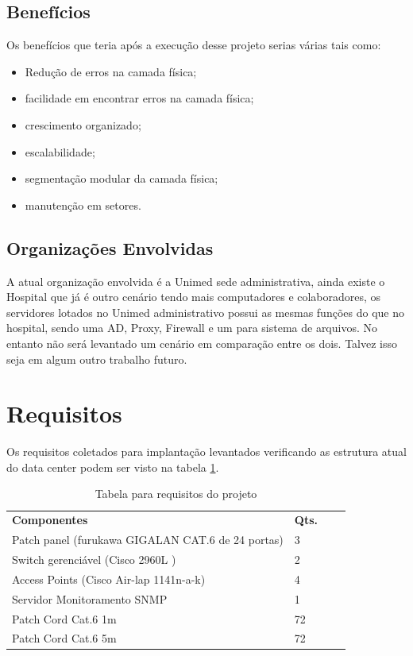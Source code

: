 \documentclass[	DIV=calc,%
							paper=a4,%
							fontsize=12pt,%
							onecolumn]{scrartcl}	 					%
\begin{document}
\subsection{Benefícios}
Os benefícios que teria após a execução desse projeto serias várias tais como: 

\begin{itemize}
	\item Redução de erros na camada física;
	\item facilidade em encontrar erros na camada física;
	\item crescimento organizado;
	\item escalabilidade;
	\item segmentação modular da camada física;
	\item manutenção em setores.
\end{itemize}
 
\subsection{Organizações Envolvidas}
A atual organização envolvida é a Unimed sede administrativa, ainda existe o Hospital que já é outro cenário tendo mais computadores e colaboradores, os servidores lotados no Unimed administrativo possui as mesmas funções do que no hospital, sendo uma AD, Proxy, Firewall e um para sistema de arquivos. No entanto não será levantado um cenário em comparação entre os dois. Talvez isso seja em algum outro trabalho futuro.


\section{Requisitos}\label{sec:Requisitos}
Os requisitos coletados para implantação levantados verificando as estrutura atual do data center podem ser visto na tabela \ref{tab:requisitos}.

\begin{table}[!htbp]
	\centering
	\begin{tabular}{|l|l|ll}
		\cline{1-2}
		\textbf{Componentes}        & \textbf{Qts.} &  &   \\
		\cline{1-2}
		Patch panel (furukawa GIGALAN CAT.6 de 24 portas) & 3    &  &   \\
		Switch gerenciável (Cisco 2960L ) & 2    &  &   \\
		Access Points 	   (Cisco Air-lap 1141n-a-k) & 4    &  &   \\
		Servidor Monitoramento SNMP 	   & 1    &  &   \\	
		Patch Cord Cat.6  1m	   & 72    &  &   \\
		Patch Cord Cat.6  5m	   & 72    &  &   \\
		\cline{1-2} 
	\end{tabular}
		\caption{Tabela para requisitos do projeto}\label{tab:requisitos}
\end{table}
\end{document}
